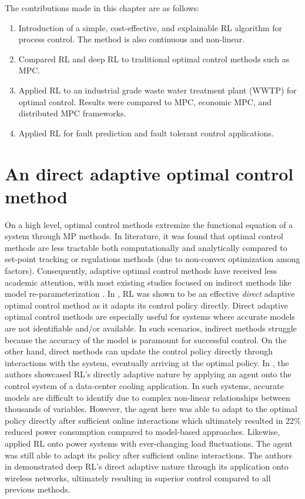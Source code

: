 The contributions made in this chapter are as follows:
\begin{enumerate}
    \item Introduction of a simple, cost-effective, and explainable RL algorithm for process control.  The method is also continuous and non-linear.
    \item Compared RL and deep RL to traditional optimal control methods such as MPC.
    \item Applied RL to an industrial grade waste water treatment plant (WWTP) for optimal control.  Results were compared to MPC, economic MPC, and distributed MPC frameworks.
    \item Applied RL for fault prediction and fault tolerant control applications.
\end{enumerate}


\section{An direct adaptive optimal control method}
On a high level, optimal control methods extremize the functional equation of a system through MP methods. In literature, it was found that optimal control methods are less tractable both computationally and analytically compared to set-point tracking or regulations methods (due to non-convex optimization among factors). Consequently, adaptive optimal control methods have received less academic attention, with most existing studies focused on indirect methods like model re-parameterization \cite{rl_control}.  In \cite{rl_control}, RL was shown to be an effective \textit{direct} adaptive optimal control method as it adapts its control policy directly. Direct adaptive optimal control methods are especially useful for systems where accurate models are not identifiable and/or available.  In such scenarios, indirect methods struggle because the accuracy of the model is paramount for successful control.  On the other hand, direct methods can update the control policy directly through interactions with the system, eventually arriving at the optimal policy. In \cite{power_control}, the authors showcased RL's directly adaptive nature by applying an agent onto the control system of a data-center cooling application. In such systems, accurate models are difficult to identify due to complex non-linear relationships between thousands of variables. However, the agent here was able to adapt to the optimal policy directly after sufficient online interactions which ultimately resulted in 22\% reduced power consumption compared to model-based approaches.  Likewise, \cite{power_control2} applied RL onto power systems with ever-changing load fluctuations.  The agent was still able to adapt its policy after sufficient online interactions. The authors in \cite{power_control3} demonstrated deep RL's direct adaptive nature through its application onto wireless networks, ultimately resulting in superior control compared to all previous methods.

